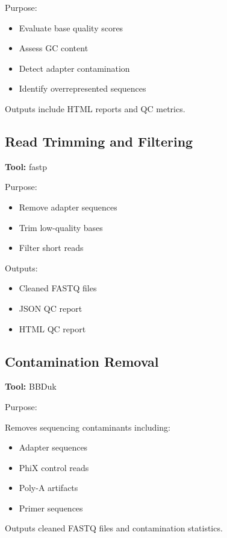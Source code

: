 \documentclass[11pt]{article}
\begin{document}
Purpose:

\begin{itemize}
\item Evaluate base quality scores
\item Assess GC content
\item Detect adapter contamination
\item Identify overrepresented sequences
\end{itemize}

Outputs include HTML reports and QC metrics.

\subsection{Read Trimming and Filtering}

\textbf{Tool:} fastp

Purpose:

\begin{itemize}
\item Remove adapter sequences
\item Trim low-quality bases
\item Filter short reads
\end{itemize}

Outputs:

\begin{itemize}
\item Cleaned FASTQ files
\item JSON QC report
\item HTML QC report
\end{itemize}

\subsection{Contamination Removal}

\textbf{Tool:} BBDuk

Purpose:

Removes sequencing contaminants including:

\begin{itemize}
\item Adapter sequences
\item PhiX control reads
\item Poly-A artifacts
\item Primer sequences
\end{itemize}

Outputs cleaned FASTQ files and contamination statistics.
\end{document}
